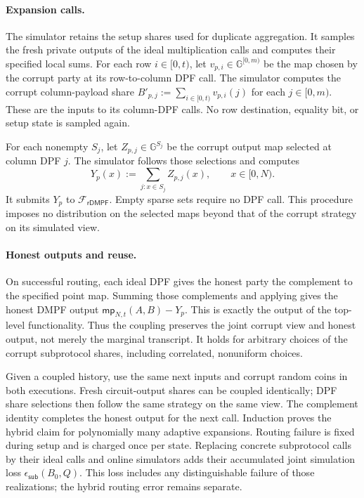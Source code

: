 \paragraph{Expansion calls.}
The simulator retains the setup shares used for duplicate aggregation.
It samples the fresh private outputs of the ideal multiplication calls and
computes their specified local sums. For each row $i\in[0,t)$, let
$v_{p,i}\in\mathbb G^{[0,m)}$ be the map chosen by the corrupt party at its
row-to-column DPF call. The simulator computes the corrupt column-payload
share $B'_{p,j}:=\sum_{i\in[0,t)}v_{p,i}(j)$ for each $j\in[0,m)$.
These are the inputs to its column-DPF calls. No row destination, equality
bit, or setup state is sampled again.

For each nonempty $S_j$, let $Z_{p,j}\in\mathbb G^{S_j}$ be the corrupt
output map selected at column DPF $j$. The simulator follows those selections
and computes
\begin{equation}\label{eq:waterfall-sim-output-completion}
 Y_p(x):=\sum_{j:x\in S_j}Z_{p,j}(x),\qquad x\in[0,N).
\end{equation}
It submits $Y_p$ to $\mathcal F_{\mathsf{rDMPF}}$. Empty sparse sets require
no DPF call. This procedure imposes no distribution on the selected maps
beyond that of the corrupt strategy on its simulated view.

\paragraph{Honest outputs and reuse.}
On successful routing, each ideal DPF gives the honest party the complement
to the specified point map. Summing those complements and applying
 gives the honest DMPF output
$\mathsf{mp}_{N,t}(A,B)-Y_p$. This is exactly the output of the top-level
functionality. Thus the coupling preserves the joint corrupt view and honest
output, not merely the marginal transcript. It holds for arbitrary choices
of the corrupt subprotocol shares, including correlated, nonuniform choices.

Given a coupled history, use the same next inputs and corrupt random coins
in both executions. Fresh circuit-output shares can be coupled identically;
DPF share selections then follow the same strategy on the same view.
The complement identity completes the honest output for the next call.
Induction proves the hybrid claim for polynomially many adaptive expansions.
Routing failure is fixed during setup and is charged once per state.
Replacing concrete subprotocol calls by their ideal calls and online
simulators adds their accumulated joint simulation loss
$\epsilon_{\mathsf{sub}}(B_0,Q)$. This loss includes any distinguishable
failure of those realizations; the hybrid routing error remains separate.
